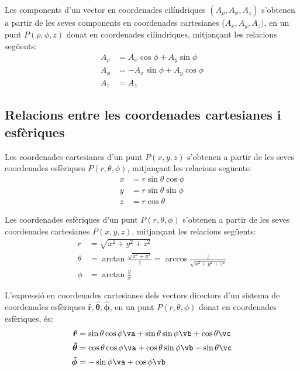 \documentclass[catalan,a4paper,twoside,11pt]{article}
\begin{document}
Les components d'un vector en coordenades cilíndriques $(A_\rho, A_\phi, A_z)$ s'obtenen a partir de les seves components en coordenades cartesianes ($A_x, A_y, A_z)$, en un punt $P(\rho,\phi,z)$ donat en coordenades cilíndriques, mitjançant les relacions següents:
\begin{subequations}\begin{align}
    A_\rho &=  A_x\cos\phi+A_y\sin\phi\\
    A_\phi &= -A_x\sin\phi+A_y\cos\phi \\
    A_z &= A_z
\end{align}\end{subequations}


\subsection{Relacions entre les coordenades cartesianes i
esfèriques}

Les coordenades cartesianes  d'un punt $P(x,y,z)$ s'obtenen a partir
de les seves coordenades esfèriques $P(r,\theta,\phi)$,
mitjançant les relacions següents:
\begin{subequations}\begin{align}
    x &=r\sin\theta\cos\phi \\ y &=r\sin\theta\sin\phi \\ z &=r\cos\theta
\end{align}\end{subequations}

Les coordenades  esfèriques  d'un punt $P(r,\theta,\phi)$
s'obtenen a partir de les seves coordenades cartesianes $P(x,y,z)$,
mitjançant les relacions següents:
\begin{subequations}\begin{align}
    r &=\sqrt{x^2+y^2+z^2}\\
    \theta&=\arctan{\frac{\sqrt{x^2+y^2}}{z}}=\arccos\frac{z}{\sqrt{x^2+y^2+z^2}}\\[1mm]
    \phi &=\arctan\frac{y}{x}
\end{align}\end{subequations}


L'expressió en coordenades cartesianes dels vectors directors d'un sistema de coordenades  esfèriques $\boldsymbol{\hat{r}},\boldsymbol{\hat{\theta}},\boldsymbol{\hat{\phi}}$, en un punt $P(r,\theta,\phi)$ donat en coordenades esfèriques, és:
\begin{subequations}\begin{align}
    \boldsymbol{\hat{r}} &=\sin\theta\cos\phi\va+ \sin\theta\sin\phi\vb+\cos\theta\vc\\
    \boldsymbol{\hat{\theta}} &=\cos\theta\cos\phi\va+
    \cos\theta\sin\phi\vb-\sin\theta\vc\\
    \boldsymbol{\hat{\phi}}&=-\sin\phi\va+\cos\phi\vb
\end{align}\end{subequations}
\end{document}
